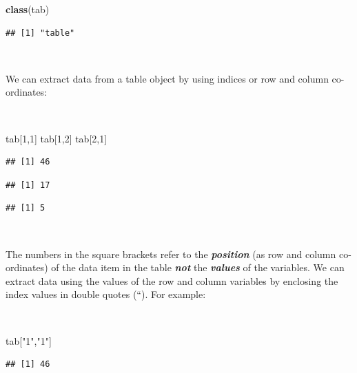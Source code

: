 \documentclass[12pt,a4paper]{book}
\newenvironment{Shaded}{\begin{snugshade}}{\end{snugshade}}
\newcommand{\DecValTok}[1]{\textcolor[rgb]{0.00,0.00,0.81}{#1}}
\newcommand{\KeywordTok}[1]{\textcolor[rgb]{0.13,0.29,0.53}{\textbf{#1}}}
\newcommand{\NormalTok}[1]{#1}
\newcommand{\StringTok}[1]{\textcolor[rgb]{0.31,0.60,0.02}{#1}}
\theoremstyle{definition}
\theoremstyle{definition}
\theoremstyle{definition}
\theoremstyle{remark}
\begin{document}
\begin{Shaded}
\begin{Highlighting}[]
\KeywordTok{class}\NormalTok{(tab)}
\end{Highlighting}
\end{Shaded}

\begin{verbatim}
## [1] "table"
\end{verbatim}

~

We can extract data from a table object by using indices or row and
column co-ordinates:

~

\begin{Shaded}
\begin{Highlighting}[]
\NormalTok{tab[}\DecValTok{1}\NormalTok{,}\DecValTok{1}\NormalTok{]}
\NormalTok{tab[}\DecValTok{1}\NormalTok{,}\DecValTok{2}\NormalTok{]}
\NormalTok{tab[}\DecValTok{2}\NormalTok{,}\DecValTok{1}\NormalTok{]}
\end{Highlighting}
\end{Shaded}

\begin{verbatim}
## [1] 46
\end{verbatim}

\begin{verbatim}
## [1] 17
\end{verbatim}

\begin{verbatim}
## [1] 5
\end{verbatim}

~

The numbers in the square brackets refer to the \textbf{\emph{position}}
(as row and column co-ordinates) of the data item in the table
\textbf{\emph{not}} the \textbf{\emph{values}} of the variables. We can
extract data using the values of the row and column variables by
enclosing the index values in double quotes (``). For example:

~

\begin{Shaded}
\begin{Highlighting}[]
\NormalTok{tab[}\StringTok{"1"}\NormalTok{,}\StringTok{"1"}\NormalTok{]}
\end{Highlighting}
\end{Shaded}

\begin{verbatim}
## [1] 46
\end{verbatim}
\end{document}
